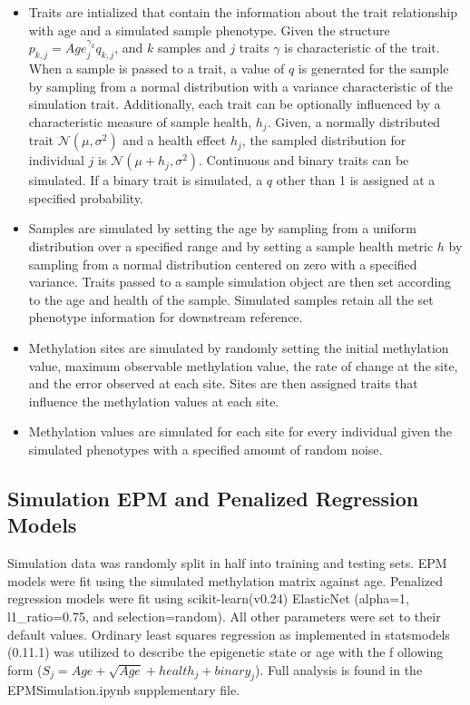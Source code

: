 \documentclass{article}
\begin{document}
{\begin{linenumbers}
\begin{itemize}
    \item{Traits are intialized that contain the information about the trait relationship with age and a 
    simulated sample phenotype. Given the structure $p_{k,j} = Age_j^{\gamma_{k}} q_{k,j}$, and $k$ samples 
    and $j$ traits $\gamma$ is characteristic of the trait. When a sample is passed to a trait, a value of $q$ is
    generated for the sample by sampling from a normal distribution with a variance characteristic of the 
    simulation trait. Additionally, each trait can be optionally influenced by a characteristic measure of sample 
    health, $h_j$. Given, a normally distributed trait $\mathcal{N}(\mu,\sigma^{2})$ and a health effect $h_j$, 
    the sampled distribution for individual $j$ is $\mathcal{N}(\mu + h_j,\sigma^{2})$. Continuous and binary 
    traits can be simulated. If a binary trait is simulated, a $q$ other than 1 is assigned at a 
    specified probability.}
     
    \item{Samples are simulated by setting the age by sampling from a uniform distribution over a specified range 
    and by setting a sample health metric $h$ by sampling from a normal distribution centered on zero with a 
    specified variance. Traits passed to a sample simulation object are then set according to the age and 
    health of the sample. Simulated samples retain all the set phenotype information for downstream reference.}

    \item{Methylation sites are simulated by randomly setting the initial methylation value, maximum observable 
    methylation value, the rate of change at the site, and the error observed at each site. Sites are then assigned 
    traits that influence the methylation values at each site.}

    \item{Methylation values are simulated for each site for every individual given the simulated phenotypes with a 
    specified amount of random noise.}
\end{itemize}

\subsection{Simulation EPM and Penalized Regression Models}

Simulation data was randomly split in half into training and testing sets. EPM models were fit using the 
simulated methylation matrix against age. Penalized regression models were fit 
using scikit-learn(v0.24)\cite{Pedregosa2011-fi} ElasticNet (alpha=1, l1\_ratio=0.75, and selection=random). 
All other parameters were set to their default values. Ordinary least squares regression as implemented in 
statsmodels (0.11.1)\cite{Seabold2010-lt} was utilized to describe the epigenetic state or age with the f
ollowing form ($S_j  = Age + \sqrt{Age} + health_j + binary_j$). Full analysis is found in the 
EPMSimulation.ipynb supplementary file.  


\end{linenumbers}}
\end{document}
